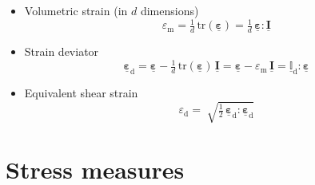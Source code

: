 \documentclass[fleqn, colorlinks]{goose-article}
\newcommand\T[1]{\underline{\bm{{#1}}}}
\newcommand\TT[1]{\underline{\mathbb{{#1}}}}
\begin{document}
\begin{itemize}

    \item Volumetric strain (in $d$ dimensions)
    \begin{equation}
        \varepsilon_\mathrm{m}
        = \tfrac{1}{d} \, \mathrm{tr} ( \T{\varepsilon} )
        = \tfrac{1}{d} \, \T{\varepsilon} : \T{I}
    \end{equation}

    \item Strain deviator
    \begin{equation}
        \T{\varepsilon}_\mathrm{d}
        = \T{\varepsilon} - \tfrac{1}{d} \, \mathrm{tr} ( \T{\varepsilon} ) \, \T{I}
        = \T{\varepsilon} - \varepsilon_\mathrm{m} \, \T{I}
        = \TT{I}_\mathrm{d} : \T{\varepsilon}
    \end{equation}

    \item Equivalent shear strain
    \begin{equation}
        \varepsilon_\mathrm{d}
        = \; \sqrt{
          \tfrac{1}{2} \, \T{\varepsilon}_\mathrm{d} : \T{\varepsilon}_\mathrm{d}
        }
    \end{equation}

\end{itemize}

\section{Stress measures}
\label{sec:nomenclature::stress}
\end{document}
